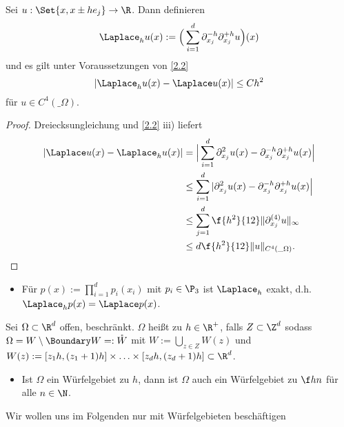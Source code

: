 \begin{kor} \label{2.3} 
	Sei $u : \Set{x, x \pm h e_j} \to \R$.
	Dann definieren
	\begin{equation} \label{eq:2.1}
		\Laplace_h u(x) :=
		\Big(\sum_{i=1}^d \partial_{x_j}^{-h} \partial_{x_j}^{+h} u \Big) (x)
	\end{equation}
	und es gilt unter Voraussetzungen von \ref{2.2}
	\[
		|\Laplace_h u(x) - \Laplace u(x)| \le C h^2
	\]
	für $u \in C^4(\_\Omega)$.
	\begin{proof}
		Dreiecksungleichung und \ref{2.2} iii) liefert
		\begin{align*}
			|\Laplace u(x) - \Laplace_h u(x)|
			&= \Big| \sum_{i=1}^d \partial_{x_j}^2 u(x) - \partial_{x_j}^{-h} \partial_{x_j}^{+h} u(x) \Big| \\
			&\le \sum_{i=1}^d | \partial_{x_j}^2 u(x) - \partial_{x_j}^{-h} \partial_{x_j}^{+h} u(x) \Big| \\
			&\le \sum_{j=1}^d \f {h^2}{12} \|\partial_{x_j}^{(4)} u\|_\infty \\
			&\le d \f {h^2}{12} \|u\|_{C^4(\_\Omega)}.
		\end{align*}
	\end{proof}
	\begin{note}
		\begin{itemize}
			\item
				Für $p(x) := \prod_{i=1}^d p_i(x_i)$ mit $p_i \in \P_3$ ist $\Laplace_h$ exakt, d.h. $\Laplace_h p(x) = \Laplace p(x)$.
		\end{itemize}
	\end{note}
\end{kor}


\begin{df}[Würfelgebiet] \label{2.4}
	Sei $\Omega \subset \R^d$ offen, beschränkt.
	$\Omega$ heißt  zu $h \in \R^+$, falls $Z \subset \Z^d$ sodass $\Omega = W \setminus \Boundary W =: \mathring W$ mit $W := \bigcup_{z \in Z} W(z)$ und $W(z) := [z_1h , (z_1+1)h] \times \dotsc \times [z_d h, (z_d+1)h] \subset \R^d$.
	\begin{note}
		\begin{itemize}
			\item
				Ist $\Omega$ ein Würfelgebiet zu $h$, dann ist $\Omega$ auch ein Würfelgebiet zu $\f hn$ für alle $n \in \N$.
		\end{itemize}
	\end{note}
\end{df}

Wir wollen uns im Folgenden nur mit Würfelgebieten beschäftigen

